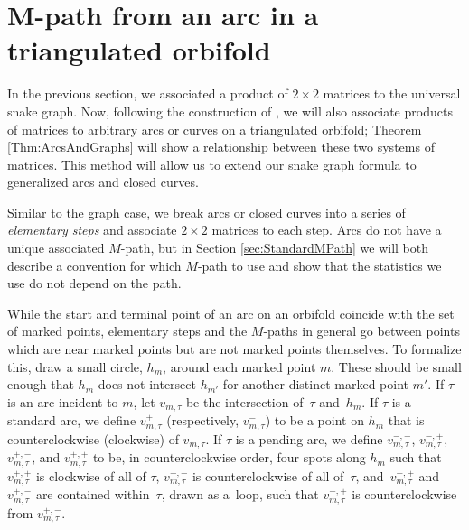 \documentclass[pdftex]{sigma}%
\numberwithin{equation}{section}
\begin{document}
\section[$M$-path from an arc in a triangulated orbifold]{$\boldsymbol{M}$-path from an arc in a triangulated orbifold} \label{sec:$M$-path}

In the previous section, we associated a product of $2 \times 2$ matrices to the universal snake graph. Now, following the construction of \cite{MW}, we will also associate products of matrices to arbitrary arcs or curves on a triangulated orbifold; Theorem \ref{Thm:ArcsAndGraphs} will show a relationship between these two systems of matrices. This method will allow us to extend our snake graph formula to generalized arcs and closed curves.

Similar to the graph case, we break arcs or closed curves into a series of \emph{elementary steps} and associate $2 \times 2$ matrices to each step. Arcs do not have a unique associated $M$-path, but in Section \ref{sec:StandardMPath} we will both describe a convention for which $M$-path to use and show that the statistics we use do not depend on the path.

While the start and terminal point of an arc on an orbifold coincide with the set of marked points, elementary steps and the $M$-paths in general go between points which are near marked points but are not marked points themselves. To formalize this, draw a small circle, $h_m$, around each marked point $m$. These should be small enough that $h_m$ does not intersect $h_{m'}$ for another distinct marked point $m'$. If $\tau$ is an arc incident to $m$, let $v_{m,\tau}$ be the intersection of~$\tau$ and~$h_m$. If $\tau$ is a standard arc, we define $v^+_{m,\tau}$ (respectively, $v^-_{m,\tau}$) to be a point on $h_m$ that is counterclockwise (clockwise) of $v_{m,\tau}$. If $\tau$ is a pending arc, we define $v^{-,-}_{m,\tau}$, $v^{-,+}_{m,\tau}$, $v^{+,-}_{m,\tau}$, and $v^{+,+}_{m,\tau}$ to be, in counterclockwise order, four spots along $h_m$ such that $v^{+,+}_{m,\tau}$ is clockwise of all of $\tau$, $v^{-,-}_{m,\tau}$ is counterclockwise of all of~$\tau$, and~$v^{-,+}_{m,\tau}$ and~$v^{+,-}_{m,\tau}$ are contained within~$\tau$, drawn as a~loop, such that $v^{-,+}_{m,\tau}$ is counterclockwise from $v^{+,-}_{m,\tau}$.
\end{document}
